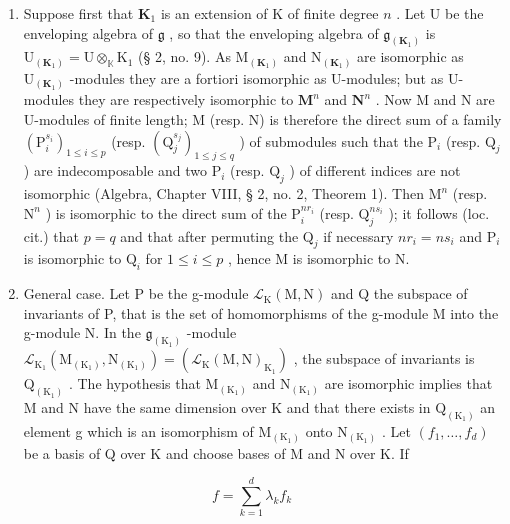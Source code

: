 \begin{enumerate}
\def\labelenumi{(\arabic{enumi})}
\item
  Suppose first that \(\mathbf{K}_1\) is an extension of K of finite degree \(n\) . Let U be the enveloping algebra of \(\mathfrak{g}\) , so that the enveloping algebra of \(\mathfrak{g}_{(\mathbf{K}_1)}\) is \(\mathrm{U}_{(\mathbf{K}_1)} = \mathrm{U} \otimes_{\mathbb{K}} \mathrm{K}_1\) (§ 2, no. 9). As \(\mathrm{M}_{(\mathbf{K}_1)}\) and \(\mathrm{N}_{(\mathbf{K}_1)}\) are isomorphic as \(\mathrm{U}_{(\mathbf{K}_1)}\) -modules they are a fortiori isomorphic as U-modules; but as U-modules they are respectively isomorphic to \(\mathbf{M}^n\) and \(\mathbf{N}^n\) . Now M and N are U-modules of finite length; M (resp. N) is therefore the direct sum of a family \((\mathrm{P}_i^{s_i})_{1 \leqslant i \leqslant p}\) (resp. \((\mathrm{Q}_j^{s_j})_{1 \leqslant j \leqslant q}\) ) of submodules such that the \(\mathrm{P}_i\) (resp. \(\mathrm{Q}_j\) ) are indecomposable and two \(\mathrm{P}_i\) (resp. \(\mathrm{Q}_j\) ) of different indices are not isomorphic (Algebra, Chapter VIII, § 2, no. 2, Theorem 1). Then \(\mathrm{M}^n\) (resp. \(\mathrm{N}^n\) ) is isomorphic to the direct sum of the \(\mathrm{P}_i^{nr_i}\) (resp. \(\mathrm{Q}_j^{ns_i}\) ); it follows (loc. cit.) that \(p = q\) and that after permuting the \(\mathrm{Q}_j\) if necessary \(nr_i = ns_i\) and \(\mathrm{P}_i\) is isomorphic to \(\mathrm{Q}_i\) for \(1 \leqslant i \leqslant p\) , hence M is isomorphic to N.
\item
  General case. Let P be the g-module \(\mathcal{L}_{\mathrm{K}}(\mathrm{M},\mathrm{N})\) and Q the subspace of invariants of P, that is the set of homomorphisms of the g-module M into the g-module N. In the \(\mathfrak{g}_{(\mathrm{K}_{1})}\) -module \(\mathcal{L}_{\mathrm{K}_{1}}(\mathrm{M}_{(\mathrm{K}_{1})},\mathrm{N}_{(\mathrm{K}_{1})})=(\mathcal{L}_{\mathrm{K}}(\mathrm{M},\mathrm{N})_{\mathrm{K}_{1}})\) , the subspace of invariants is \(\mathrm{Q}_{(\mathrm{K}_{1})}\) . The hypothesis that \(\mathrm{M}_{(\mathrm{K}_{1})}\) and \(\mathrm{N}_{(\mathrm{K}_{1})}\) are isomorphic implies that M and N have the same dimension over K and that there exists in \(\mathrm{Q}_{(\mathrm{K}_{1})}\) an element g which is an isomorphism of \(\mathrm{M}_{(\mathrm{K}_{1})}\) onto \(\mathrm{N}_{(\mathrm{K}_{1})}\) . Let \((f_{1},\ldots,f_{d})\) be a basis of Q over K and choose bases of M and N over K. If
\end{enumerate}

\[
f = \sum_ {k = 1} ^ {d} \lambda_ {k} f _ {k}
\]


